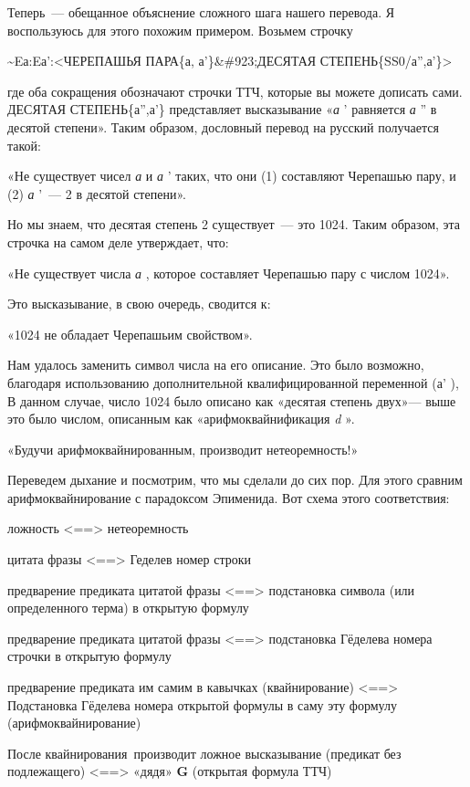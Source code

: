 \documentclass[../main.tex]{subfiles}
\begin{document}
Теперь~--- обещанное объяснение сложного шага нашего перевода. Я воспользуюсь для этого похожим примером. Возьмем строчку

\textasciitilde Eа:Eа':\textless ЧЕРЕПАШЬЯ ПАРА\{а, а'\}\&\#923;ДЕСЯТАЯ СТЕПЕНЬ\{SS0/а'',а'\}\textgreater{}

где оба сокращения обозначают строчки ТТЧ, которые вы можете дописать сами. ДЕСЯТАЯ СТЕПЕНЬ\{а'',а'\} представляет высказывание «\emph{а} ' равняется \emph{а} '' в десятой степени». Таким образом, дословный перевод на русский получается такой:

«Не существует чисел \emph{а} и \emph{а} ' таких, что они (1) составляют Черепашью пару, и (2) \emph{а} '~--- 2 в десятой степени».

Но мы знаем, что десятая степень 2 существует~--- это 1024. Таким образом, эта строчка на самом деле утверждает, что:

«Не существует числа \emph{а} , которое составляет Черепашью пару с числом 1024».

Это высказывание, в свою очередь, сводится к:

«1024 не обладает Черепашьим свойством».

Нам удалось заменить символ числа на его описание. Это было возможно, благодаря использованию дополнительной квалифицированной переменной (а' ), В данном случае, число 1024 было описано как «десятая степень двух»--- выше это было числом, описанным как «арифмоквайнификация \emph{d} ».

«Будучи арифмоквайнированным, производит нетеоремность!»

Переведем дыхание и посмотрим, что мы сделали до сих пор. Для этого сравним арифмоквайнирование с парадоксом Эпименида. Вот схема этого соответствия:

ложность \textless==\textgreater{} нетеоремность

цитата фразы \textless==\textgreater{} Геделев номер строки

предварение предиката цитатой фразы \textless==\textgreater{} подстановка символа (или определенного терма) в открытую формулу

предварение предиката цитатой фразы \textless==\textgreater{} подстановка Гёделева номера строчки в открытую формулу

предварение предиката им самим в кавычках (квайнирование) \textless==\textgreater{} Подстановка Гёделева номера открытой формулы в саму эту формулу (арифмоквайнирование)

После квайнирования~производит ложное высказывание (предикат без подлежащего) \textless==\textgreater{} «дядя» \textbf{G} (открытая формула ТТЧ)
\end{document}
